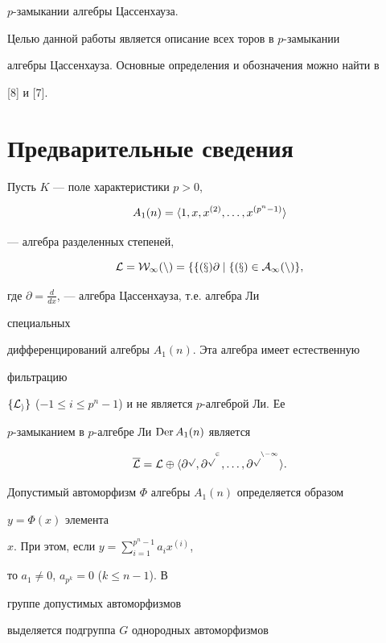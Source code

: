 $p$-замыкании алгебры Цассенхауза.





Целью данной работы является описание всех торов в $p$-замыкании


алгебры Цассенхауза. Основные определения и обозначения можно найти в


[8] и [7].





\section{Предварительные сведения}





Пусть $K$ --- поле характеристики $p>0$,


$$


A_1(n)=\la 1,x,x^{(2)},\dotsc,x^{(p^n-1)}\ra


$$


--- алгебра разделенных степеней,


$$


\cal L=W_1(n)=\{f(x)\partial\mid f(x)\in A_1(n)\},


$$


где $\partial=\frac{d}{dx}$, --- алгебра Цассенхауза, т.е. алгебра Ли


специальных


дифференцирований алгебры $A_1(n)$. Эта алгебра имеет естественную


фильтрацию


$\{\cal L_i\}$ ($-1\le i\le p^n-1$) и не является $p$-алгеброй Ли. Ее


$p$-замыканием в $p$-алгебре Ли $\operatorname{Der} A_1(n)$ является


$$


\overline{\cal L}=\cal L\oplus\la\partial^p,\partial^{p^2},\dotsc,


\partial^{p^{n-1}}\ra.


$$


Допустимый автоморфизм $\Phi$ алгебры $A_1(n)$ определяется образом


$y=\Phi(x)$ элемента


$x$. При этом, если $y=\sum\limits^{p^n-1}_{i=1}a_ix^{(i)}$,


то $a_1\ne 0$, $a_{p^k}=0$ ($k\le n-1$). В


группе допустимых автоморфизмов


выделяется подгруппа $G$ однородных автоморфизмов


